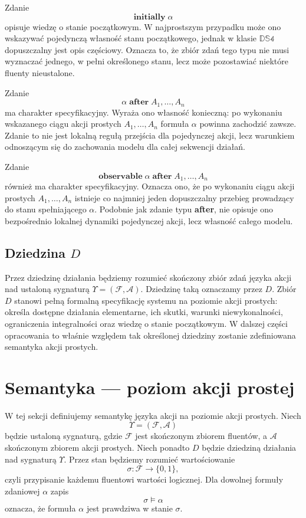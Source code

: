 \documentclass[11pt,a4paper]{article}
\theoremstyle{definition}
\begin{document}
Zdanie
\[
\textbf{initially}\; \alpha
\]
opisuje wiedzę o stanie początkowym. W najprostszym przypadku może ono wskazywać pojedynczą własność stanu początkowego, jednak w klasie $\mathbb{DS4}$ dopuszczalny jest opis częściowy. Oznacza to, że zbiór zdań tego typu nie musi wyznaczać jednego, w pełni określonego stanu, lecz może pozostawiać niektóre fluenty nieustalone.

Zdanie
\[
\alpha \;\textbf{after}\; A_1,\dots,A_n
\]
ma charakter specyfikacyjny. Wyraża ono własność konieczną: po wykonaniu wskazanego ciągu akcji prostych $A_1,\dots,A_n$ formuła $\alpha$ powinna zachodzić zawsze. Zdanie to nie jest lokalną regułą przejścia dla pojedynczej akcji, lecz warunkiem odnoszącym się do zachowania modelu dla całej sekwencji działań.

Zdanie
\[
\textbf{observable}\; \alpha \;\textbf{after}\; A_1,\dots,A_n
\]
również ma charakter specyfikacyjny. Oznacza ono, że po wykonaniu ciągu akcji prostych $A_1,\dots,A_n$ istnieje co najmniej jeden dopuszczalny przebieg prowadzący do stanu spełniającego $\alpha$. Podobnie jak zdanie typu \textbf{after}, nie opisuje ono bezpośrednio lokalnej dynamiki pojedynczej akcji, lecz własność całego modelu.

\subsection{Dziedzina \texorpdfstring{$D$}{D}}

Przez dziedzinę działania będziemy rozumieć skończony zbiór zdań języka akcji nad ustaloną sygnaturą $\Upsilon=(\mathcal{F},\mathcal{A})$. Dziedzinę taką oznaczamy przez $D$. Zbiór $D$ stanowi pełną formalną specyfikację systemu na poziomie akcji prostych: określa dostępne działania elementarne, ich skutki, warunki niewykonalności, ograniczenia integralności oraz wiedzę o stanie początkowym. W dalszej części opracowania to właśnie względem tak określonej dziedziny zostanie zdefiniowana semantyka akcji prostych.

\section{Semantyka --- poziom akcji prostej}

W tej sekcji definiujemy semantykę języka akcji na poziomie akcji prostych. Niech
\[
\Upsilon = (\mathcal{F},\mathcal{A})
\]
będzie ustaloną sygnaturą, gdzie $\mathcal{F}$ jest skończonym zbiorem fluentów, a $\mathcal{A}$ skończonym zbiorem akcji prostych. Niech ponadto $D$ będzie dziedziną działania nad sygnaturą $\Upsilon$. Przez stan będziemy rozumieć wartościowanie
\[
\sigma : \mathcal{F} \to \{0,1\},
\]
czyli przypisanie każdemu fluentowi wartości logicznej. Dla dowolnej formuły zdaniowej $\alpha$ zapis
\[
\sigma \models \alpha
\]
oznacza, że formuła $\alpha$ jest prawdziwa w stanie $\sigma$.
\end{document}
